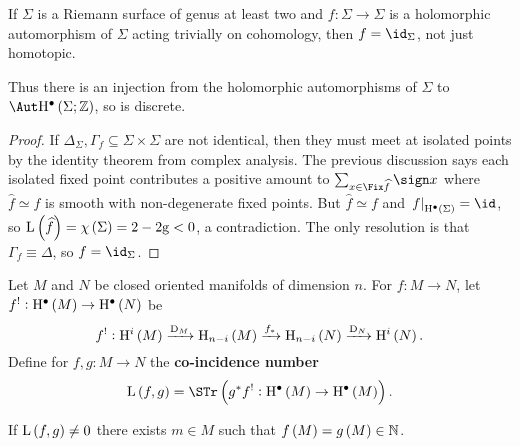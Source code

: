 \begin{corollary}
If $ \Sigma $ is a Riemann surface of genus at least two and $ f : \Sigma \to \Sigma $ is a holomorphic automorphism of $ \Sigma $ acting trivially on cohomology, then $ f = \id_\Sigma $, not just homotopic.
\end{corollary}

Thus there is an injection from the holomorphic automorphisms of $ \Sigma $ to $ \Aut \H^\bullet\br{\Sigma; \ZZ} $, so is discrete.

\begin{proof}
If $ \Delta_\Sigma, \Gamma_f \subseteq \Sigma \times \Sigma $ are not identical, then they must meet at isolated points by the identity theorem from complex analysis. The previous discussion says each isolated fixed point contributes a positive amount to $ \sum_{x \in \Fix \widehat{f}} \sign x $ where $ \widehat{f} \simeq f $ is smooth with non-degenerate fixed points. But $ \widehat{f} \simeq f $ and $ \eval{f}_{\H^\bullet\br{\Sigma}} = \id $, so $ \L\br{\widehat{f}} = \chi\br{\Sigma} = 2 - 2\g < 0 $, a contradiction. The only resolution is that $ \Gamma_f \equiv \Delta $, so $ f = \id_\Sigma $.
\end{proof}

Let $ M $ and $ N $ be closed oriented manifolds of dimension $ n $. For $ f : M \to N $, let $ f^! : \H^\bullet\br{M} \to \H^\bullet\br{N} $ be
$$ f^! : \H^i\br{M} \xrightarrow{\D_M} \H_{n - i}\br{M} \xrightarrow{f_*} \H_{n - i}\br{N} \xrightarrow{\D_N} \H^i\br{N}. $$
Define for $ f, g : M \to N $ the \textbf{co-incidence number}
$$ \L\br{f, g} = \STr \br{g^*f^! : \H^\bullet\br{M} \to \H^\bullet\br{M}}. $$

\begin{proposition}
If $ \L\br{f, g} \ne 0 $ there exists $ m \in M $ such that $ f\br{M} = g\br{M} \in \NN $.
\end{proposition}

